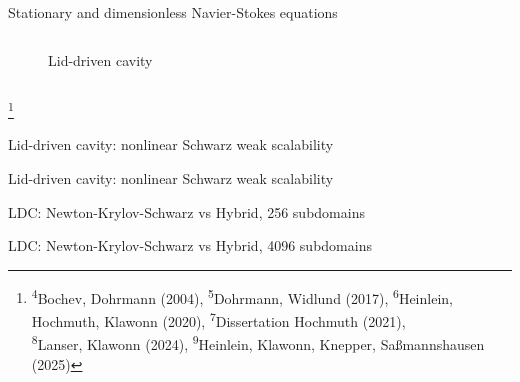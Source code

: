 \begin{frame}{Stationary and dimensionless Navier-Stokes equations}
\begin{columns}
\begin{column}{0.4\textwidth}
\begin{figure}
				\caption{Lid-driven cavity}
			\end{figure}
		\end{column}
	\end{columns}
    {\let\thefootnote\relax\footnote{{\tiny \!\!\!\!\textsuperscript{4}Bochev, Dohrmann (2004),  \textsuperscript{5}Dohrmann, Widlund (2017), \textsuperscript{6}Heinlein, Hochmuth, Klawonn (2020),  \textsuperscript{7}Dissertation Hochmuth (2021),\\\hspace{3em}\!\!\!\!\!\!\textsuperscript{8}Lanser, Klawonn (2024),  \textsuperscript{9}Heinlein, Klawonn, Knepper, Saßmannshausen (2025)}}}
\end{frame}

\begin{frame}{Lid-driven cavity: nonlinear Schwarz weak scalability}
	\begin{figure}
		\centering
		
		\label{fig:weak-scalability-nls}
	\end{figure}
\end{frame}

\begin{frame}{Lid-driven cavity: nonlinear Schwarz weak scalability}
	\begin{figure}
		\centering
		
		\label{fig:weak-scalability-per-iter-nls}
	\end{figure}
\end{frame}

\begin{frame}{LDC: Newton-Krylov-Schwarz vs Hybrid, 256 subdomains}
	\begin{figure}
		\centering
		
		\label{fig:residual-ldc-256}
	\end{figure}
\end{frame}

\begin{frame}{LDC: Newton-Krylov-Schwarz vs Hybrid, 4096 subdomains}
	\begin{figure}
		\centering
		
		\label{fig:residual-ldc-4096}
	\end{figure}
\end{frame}


